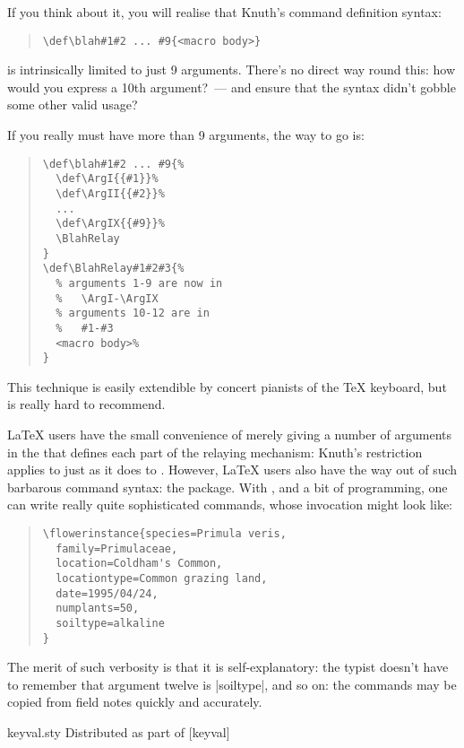 
If you think about it, you will realise that Knuth's command
definition syntax:
\begin{quote}
\begin{verbatim}
\def\blah#1#2 ... #9{<macro body>}
\end{verbatim}
\end{quote}
is intrinsically limited to just 9 arguments.  There's no direct way
round this: how would you express a 10th argument?~--- and ensure that
the syntax didn't gobble some other valid usage?

If you really must have more than 9 arguments, the way to go is:
\begin{quote}
\begin{verbatim}
\def\blah#1#2 ... #9{%
  \def\ArgI{{#1}}%
  \def\ArgII{{#2}}%
  ...
  \def\ArgIX{{#9}}%
  \BlahRelay
}
\def\BlahRelay#1#2#3{%
  % arguments 1-9 are now in
  %   \ArgI-\ArgIX
  % arguments 10-12 are in
  %   #1-#3
  <macro body>%
}
\end{verbatim}
\end{quote}
This technique is easily extendible by concert pianists of the \TeX{}
keyboard, but is really hard to recommend.

\LaTeX{} users have the small convenience of merely giving a number of
arguments in the  that defines each part of the
relaying mechanism: Knuth's restriction applies to 
just as it does to .  However, \LaTeX{} users also have the
way out of such barbarous command syntax: the 
package.  With , and a bit of programming, one can
write really quite sophisticated commands, whose invocation might look
like:
\begin{quote}
\begin{verbatim}
\flowerinstance{species=Primula veris,
  family=Primulaceae,
  location=Coldham's Common,
  locationtype=Common grazing land,
  date=1995/04/24,
  numplants=50,
  soiltype=alkaline
}
\end{verbatim}
\end{quote}
The merit of such verbosity is that it is self-explanatory: the typist
doesn't have to remember that argument twelve is |soiltype|, and so
on: the commands may be copied from field notes quickly and
accurately.
\begin{ctanrefs}
\item[keyval.sty]Distributed as part of [keyval]
\end{ctanrefs}

